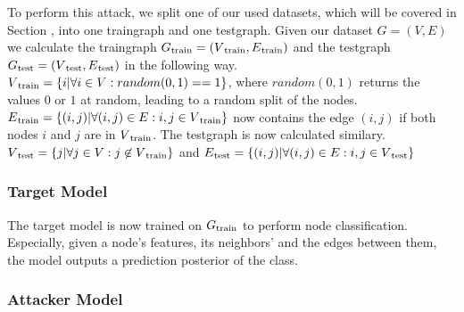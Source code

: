       To perform this attack, we split one of our used datasets, which will be covered in Section , into one traingraph and one testgraph. Given our dataset $G = (V, E)$ we calculate the traingraph  $G\textsubscript{train} = (V\textsubscript{train}, E\textsubscript{train})$ and the testgraph
      $G\textsubscript{test} = (V\textsubscript{test}, E\textsubscript{test})$ in the following way. $V\textsubscript{train} = \{i | \forall i \in V: random(0, 1) == 1\}$, where $random(0, 1)$ returns the values $0$ or $1$ at random, leading to a random split of the nodes.
      $E\textsubscript{train} = \{(i, j) | \forall (i,j) \in E: i, j \in V\textsubscript{train}\}$ now contains the edge $(i,j)$ if both nodes $i$ and $j$ are in $V\textsubscript{train}$.
      The testgraph is now calculated similary.
      $V\textsubscript{test} = \{j | \forall j \in V: j \not\in V\textsubscript{train}\}$ and $E\textsubscript{test} = \{(i, j) | \forall (i,j) \in E: i, j \in V\textsubscript{test}\}$

      \subsubsection{Target Model}

        The target model is now trained on $G\textsubscript{train}$ to perform node classification.
        Especially, given a node's features, its neighbors' and the edges between them, the model outputs a prediction posterior of the class.

      \subsubsection{Attacker Model}

